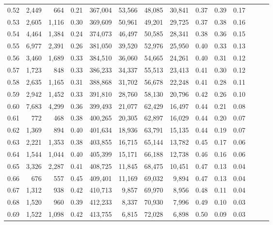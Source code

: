 \begin{tabular}{rrrrrrrrrrrrrr}
0.52 &   2,449 &    664 &  0.21 &  367,004 &   53,566 &  48,085 &  30,841 &  0.37 &  0.39 &      0.17 \\
0.53 &   2,605 &  1,116 &  0.30 &  369,609 &   50,961 &  49,201 &  29,725 &  0.37 &  0.38 &      0.16 \\
0.54 &   4,464 &  1,384 &  0.24 &  374,073 &   46,497 &  50,585 &  28,341 &  0.38 &  0.36 &      0.15 \\
0.55 &   6,977 &  2,391 &  0.26 &  381,050 &   39,520 &  52,976 &  25,950 &  0.40 &  0.33 &      0.13 \\
0.56 &   3,460 &  1,689 &  0.33 &  384,510 &   36,060 &  54,665 &  24,261 &  0.40 &  0.31 &      0.12 \\
0.57 &   1,723 &    848 &  0.33 &  386,233 &   34,337 &  55,513 &  23,413 &  0.41 &  0.30 &      0.12 \\
0.58 &   2,635 &  1,165 &  0.31 &  388,868 &   31,702 &  56,678 &  22,248 &  0.41 &  0.28 &      0.11 \\
0.59 &   2,942 &  1,452 &  0.33 &  391,810 &   28,760 &  58,130 &  20,796 &  0.42 &  0.26 &      0.10 \\
0.60 &   7,683 &  4,299 &  0.36 &  399,493 &   21,077 &  62,429 &  16,497 &  0.44 &  0.21 &      0.08 \\
0.61 &     772 &    468 &  0.38 &  400,265 &   20,305 &  62,897 &  16,029 &  0.44 &  0.20 &      0.07 \\
0.62 &   1,369 &    894 &  0.40 &  401,634 &   18,936 &  63,791 &  15,135 &  0.44 &  0.19 &      0.07 \\
0.63 &   2,221 &  1,353 &  0.38 &  403,855 &   16,715 &  65,144 &  13,782 &  0.45 &  0.17 &      0.06 \\
0.64 &   1,544 &  1,044 &  0.40 &  405,399 &   15,171 &  66,188 &  12,738 &  0.46 &  0.16 &      0.06 \\
0.65 &   3,326 &  2,287 &  0.41 &  408,725 &   11,845 &  68,475 &  10,451 &  0.47 &  0.13 &      0.04 \\
0.66 &     676 &    557 &  0.45 &  409,401 &   11,169 &  69,032 &   9,894 &  0.47 &  0.13 &      0.04 \\
0.67 &   1,312 &    938 &  0.42 &  410,713 &    9,857 &  69,970 &   8,956 &  0.48 &  0.11 &      0.04 \\
0.68 &   1,520 &    960 &  0.39 &  412,233 &    8,337 &  70,930 &   7,996 &  0.49 &  0.10 &      0.03 \\
0.69 &   1,522 &  1,098 &  0.42 &  413,755 &    6,815 &  72,028 &   6,898 &  0.50 &  0.09 &      0.03 \\

\end{tabular}
